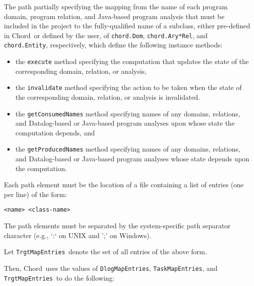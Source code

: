 \documentclass{article}
\providecommand\Chord{{Chord}}
\providecommand\TaskMapEntries{{\tt TaskMapEntries}}
\providecommand\TrgtMapEntries{{\tt TrgtMapEntries}}
\providecommand\DlogMapEntries{{\tt DlogMapEntries}}
\begin{document}
\begin{enumerate}
The path partially specifying the mapping from the name of each program domain,
program relation, and Java-based program analysis that must be included in
the project to the fully-qualified name of a
subclass, either pre-defined in \Chord\ or defined by the user, of
{\tt chord.Dom}, {\tt chord.Ary*Rel}, and {\tt chord.Entity}, respectively,
which define the following instance methods:
\begin{itemize}
\item
the {\tt execute} method specifying
the computation that updates the state of the corresponding domain, relation,
or analysis,
\item
the {\tt invalidate} method specifying the action to be taken when the
state of the corresponding domain, relation, or analysis is invalidated.
\item
the {\tt getConsumedNames} method specifying names of any domains, relations,
and Datalog-based or Java-based program analyses upon whose state the
computation depends, and
\item
the {\tt getProducedNames} method specifying names of any domains, relations,
and Datalog-based or Java-based program analyses whose state depends upon
the computation.
\end{itemize}

Each path element must be the location of a file containing a
list of entries (one per line) of the form:

{\tt <name> <class-name>}

The path elements must be separated by the system-specific path separator
character (e.g., `:` on UNIX and ';' on Windows).

Let \TrgtMapEntries\ denote the set of all entries of the above form.
\end{enumerate}

Then, \Chord\ uses the values of \DlogMapEntries, \TaskMapEntries, and \TrgtMapEntries\ 
to do the following:
\end{document}
